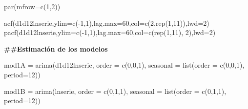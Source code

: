 \documentclass[
]{article}
\newenvironment{Shaded}{\begin{snugshade}}{\end{snugshade}}
\newcommand{\AttributeTok}[1]{\textcolor[rgb]{0.77,0.63,0.00}{#1}}
\newcommand{\DecValTok}[1]{\textcolor[rgb]{0.00,0.00,0.81}{#1}}
\newcommand{\FunctionTok}[1]{\textcolor[rgb]{0.00,0.00,0.00}{#1}}
\newcommand{\NormalTok}[1]{#1}
\newcommand{\OtherTok}[1]{\textcolor[rgb]{0.56,0.35,0.01}{#1}}
\newcommand{\SpecialCharTok}[1]{\textcolor[rgb]{0.00,0.00,0.00}{#1}}
\begin{document}
\begin{Shaded}
\begin{Highlighting}[]
\FunctionTok{par}\NormalTok{(}\AttributeTok{mfrow=}\FunctionTok{c}\NormalTok{(}\DecValTok{1}\NormalTok{,}\DecValTok{2}\NormalTok{))}

\FunctionTok{acf}\NormalTok{(d1d12lnserie,}\AttributeTok{ylim=}\FunctionTok{c}\NormalTok{(}\SpecialCharTok{{-}}\DecValTok{1}\NormalTok{,}\DecValTok{1}\NormalTok{),}\AttributeTok{lag.max=}\DecValTok{60}\NormalTok{,}\AttributeTok{col=}\FunctionTok{c}\NormalTok{(}\DecValTok{2}\NormalTok{,}\FunctionTok{rep}\NormalTok{(}\DecValTok{1}\NormalTok{,}\DecValTok{11}\NormalTok{)),}\AttributeTok{lwd=}\DecValTok{2}\NormalTok{)}
\FunctionTok{pacf}\NormalTok{(d1d12lnserie,}\AttributeTok{ylim=}\FunctionTok{c}\NormalTok{(}\SpecialCharTok{{-}}\DecValTok{1}\NormalTok{,}\DecValTok{1}\NormalTok{),}\AttributeTok{lag.max=}\DecValTok{60}\NormalTok{,}\AttributeTok{col=}\FunctionTok{c}\NormalTok{(}\FunctionTok{rep}\NormalTok{(}\DecValTok{1}\NormalTok{,}\DecValTok{11}\NormalTok{), }\DecValTok{2}\NormalTok{),}\AttributeTok{lwd=}\DecValTok{2}\NormalTok{)}
\end{Highlighting}
\end{Shaded}

\textbf{\#\#Estimación de los modelos}

\begin{Shaded}
\begin{Highlighting}[]
\NormalTok{mod1A }\OtherTok{=} \FunctionTok{arima}\NormalTok{(d1d12lnserie, }\AttributeTok{order =} \FunctionTok{c}\NormalTok{(}\DecValTok{0}\NormalTok{,}\DecValTok{0}\NormalTok{,}\DecValTok{1}\NormalTok{), }\AttributeTok{seasonal =} \FunctionTok{list}\NormalTok{(}\AttributeTok{order =} \FunctionTok{c}\NormalTok{(}\DecValTok{0}\NormalTok{,}\DecValTok{0}\NormalTok{,}\DecValTok{1}\NormalTok{), }\AttributeTok{period=}\DecValTok{12}\NormalTok{))}
\end{Highlighting}
\end{Shaded}

\begin{Shaded}
\begin{Highlighting}[]
\NormalTok{mod1B }\OtherTok{=} \FunctionTok{arima}\NormalTok{(lnserie, }\AttributeTok{order =} \FunctionTok{c}\NormalTok{(}\DecValTok{0}\NormalTok{,}\DecValTok{1}\NormalTok{,}\DecValTok{1}\NormalTok{), }\AttributeTok{seasonal =} \FunctionTok{list}\NormalTok{(}\AttributeTok{order =} \FunctionTok{c}\NormalTok{(}\DecValTok{0}\NormalTok{,}\DecValTok{1}\NormalTok{,}\DecValTok{1}\NormalTok{), }\AttributeTok{period=}\DecValTok{12}\NormalTok{))}
\end{Highlighting}
\end{Shaded}
\end{document}
